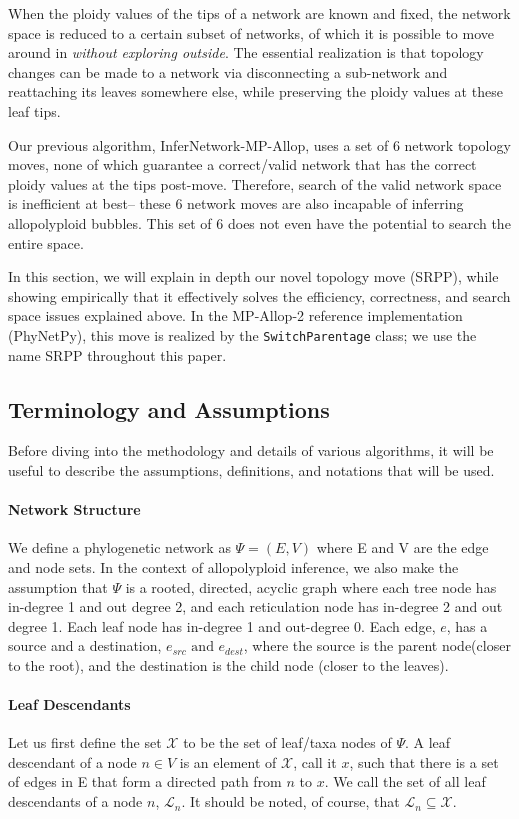 \documentclass{article}
\begin{document}
When the ploidy values of the tips of a network are known and fixed, the network space is reduced to a certain subset of networks, of which it is possible to move around in \textit{without exploring outside}. The essential realization is that topology changes can be made to a network via disconnecting a sub-network and reattaching its leaves somewhere else, while preserving the ploidy values at these leaf tips.

Our previous algorithm, InferNetwork-MP-Allop, uses a set of 6 network topology moves, none of which guarantee a correct/valid network that has the correct ploidy values at the tips post-move. Therefore, search of the valid network space is inefficient at best-- these 6 network moves are also incapable of inferring allopolyploid bubbles. This set of 6 does not even have the potential to search the entire space.

In this section, we will explain in depth our novel topology move (SRPP), while showing empirically that it effectively solves the efficiency, correctness, and search space issues explained above. In the MP-Allop-2 reference implementation (PhyNetPy), this move is realized by the \texttt{SwitchParentage} class; we use the name SRPP throughout this paper.


\subsection{Terminology and Assumptions}
Before diving into the methodology and details of various algorithms, it will be useful to describe the assumptions, definitions, and notations that will be used. 

\paragraph{Network Structure}
We define a phylogenetic network as $\Psi = (E, V)$ where E and V are the edge and node sets. In the context of allopolyploid inference, we also make the assumption that $\Psi$ is a rooted, directed, acyclic graph where each tree node has in-degree 1 and out degree 2, and each reticulation node has in-degree 2 and out degree 1. Each leaf node has in-degree 1 and out-degree 0. Each edge, $e$, has a source and a destination, $e_{src} \text{ and } e_{dest}$, where the source is the parent node(closer to the root), and the destination is the child node (closer to the leaves).

\paragraph{Leaf Descendants}
Let us first define the set $\mathcal{X}$ to be the set of leaf/taxa nodes of $\Psi$. A leaf descendant of a node $n \in V$ is an element of $\mathcal{X}$, call it $x$, such that there is a set of edges in E that form a directed path from $n$ to $x$. We call the set of all leaf descendants of a node $n$, $\mathcal{L}_n$. It should be noted, of course, that $\mathcal{L}_n \subseteq \mathcal{X}$.
\end{document}
